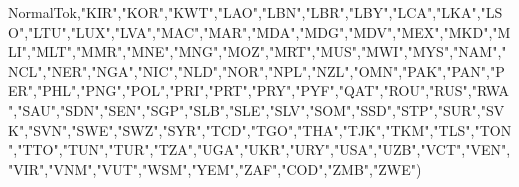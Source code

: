 \documentclass[]{article}
\newenvironment{Shaded}{\begin{snugshade}}{\end{snugshade}}
\newcommand{\NormalTok}[1]{#1}
\newcommand{\StringTok}[1]{\textcolor[rgb]{0.31,0.60,0.02}{#1}}
\begin{document}
\begin{Shaded}
\begin{Highlighting}[]
NormalTok{,}\StringTok{"KIR"}\NormalTok{,}\StringTok{"KOR"}\NormalTok{,}\StringTok{"KWT"}\NormalTok{,}\StringTok{"LAO"}\NormalTok{,}\StringTok{"LBN"}\NormalTok{,}\StringTok{"LBR"}\NormalTok{,}\StringTok{"LBY"}\NormalTok{,}\StringTok{"LCA"}\NormalTok{,}\StringTok{"LKA"}\NormalTok{,}\StringTok{"LSO"}\NormalTok{,}\StringTok{"LTU"}\NormalTok{,}\StringTok{"LUX"}\NormalTok{,}\StringTok{"LVA"}\NormalTok{,}\StringTok{"MAC"}\NormalTok{,}\StringTok{"MAR"}\NormalTok{,}\StringTok{"MDA"}\NormalTok{,}\StringTok{"MDG"}\NormalTok{,}\StringTok{"MDV"}\NormalTok{,}\StringTok{"MEX"}\NormalTok{,}\StringTok{"MKD"}\NormalTok{,}\StringTok{"MLI"}\NormalTok{,}\StringTok{"MLT"}\NormalTok{,}\StringTok{"MMR"}\NormalTok{,}\StringTok{"MNE"}\NormalTok{,}\StringTok{"MNG"}\NormalTok{,}\StringTok{"MOZ"}\NormalTok{,}\StringTok{"MRT"}\NormalTok{,}\StringTok{"MUS"}\NormalTok{,}\StringTok{"MWI"}\NormalTok{,}\StringTok{"MYS"}\NormalTok{,}\StringTok{"NAM"}\NormalTok{,}\StringTok{"NCL"}\NormalTok{,}\StringTok{"NER"}\NormalTok{,}\StringTok{"NGA"}\NormalTok{,}\StringTok{"NIC"}\NormalTok{,}\StringTok{"NLD"}\NormalTok{,}\StringTok{"NOR"}\NormalTok{,}\StringTok{"NPL"}\NormalTok{,}\StringTok{"NZL"}\NormalTok{,}\StringTok{"OMN"}\NormalTok{,}\StringTok{"PAK"}\NormalTok{,}\StringTok{"PAN"}\NormalTok{,}\StringTok{"PER"}\NormalTok{,}\StringTok{"PHL"}\NormalTok{,}\StringTok{"PNG"}\NormalTok{,}\StringTok{"POL"}\NormalTok{,}\StringTok{"PRI"}\NormalTok{,}\StringTok{"PRT"}\NormalTok{,}\StringTok{"PRY"}\NormalTok{,}\StringTok{"PYF"}\NormalTok{,}\StringTok{"QAT"}\NormalTok{,}\StringTok{"ROU"}\NormalTok{,}\StringTok{"RUS"}\NormalTok{,}\StringTok{"RWA"}\NormalTok{,}\StringTok{"SAU"}\NormalTok{,}\StringTok{"SDN"}\NormalTok{,}\StringTok{"SEN"}\NormalTok{,}\StringTok{"SGP"}\NormalTok{,}\StringTok{"SLB"}\NormalTok{,}\StringTok{"SLE"}\NormalTok{,}\StringTok{"SLV"}\NormalTok{,}\StringTok{"SOM"}\NormalTok{,}\StringTok{"SSD"}\NormalTok{,}\StringTok{"STP"}\NormalTok{,}\StringTok{"SUR"}\NormalTok{,}\StringTok{"SVK"}\NormalTok{,}\StringTok{"SVN"}\NormalTok{,}\StringTok{"SWE"}\NormalTok{,}\StringTok{"SWZ"}\NormalTok{,}\StringTok{"SYR"}\NormalTok{,}\StringTok{"TCD"}\NormalTok{,}\StringTok{"TGO"}\NormalTok{,}\StringTok{"THA"}\NormalTok{,}\StringTok{"TJK"}\NormalTok{,}\StringTok{"TKM"}\NormalTok{,}\StringTok{"TLS"}\NormalTok{,}\StringTok{"TON"}\NormalTok{,}\StringTok{"TTO"}\NormalTok{,}\StringTok{"TUN"}\NormalTok{,}\StringTok{"TUR"}\NormalTok{,}\StringTok{"TZA"}\NormalTok{,}\StringTok{"UGA"}\NormalTok{,}\StringTok{"UKR"}\NormalTok{,}\StringTok{"URY"}\NormalTok{,}\StringTok{"USA"}\NormalTok{,}\StringTok{"UZB"}\NormalTok{,}\StringTok{"VCT"}\NormalTok{,}\StringTok{"VEN"}\NormalTok{,}\StringTok{"VIR"}\NormalTok{,}\StringTok{"VNM"}\NormalTok{,}\StringTok{"VUT"}\NormalTok{,}\StringTok{"WSM"}\NormalTok{,}\StringTok{"YEM"}\NormalTok{,}\StringTok{"ZAF"}\NormalTok{,}\StringTok{"COD"}\NormalTok{,}\StringTok{"ZMB"}\NormalTok{,}\StringTok{"ZWE"}\NormalTok{)}

\end{Highlighting}
\end{Shaded}
\end{document}
